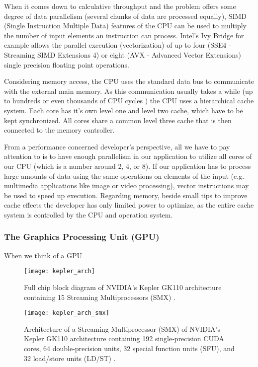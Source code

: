 When it comes down to calculative throughput and the problem offers some degree of data parallelism (several chunks of data are processed equally), SIMD (Single Instruction Multiple Data) features of the CPU can be used to multiply the number of input elements an instruction can process. Intel's Ivy Bridge for example allows the parallel execution (vectorization) of up to four (SSE4 - Streaming SIMD Extensions 4) or eight (AVX - Advanced Vector Extensions) single precision floating point operations.

Considering memory access, the CPU uses the standard data bus to communicate with the external main memory. As this communication usually takes a while (up to hundreds or even thousands of CPU cycles  \cite[p. 54]{opencl_book}) the CPU uses a hierarchical cache system. Each core has it's own level one and level two cache, which have to be kept synchronized. All cores share a common level three cache that is then connected to the memory controller.

From a performance concerned developer's perspective, all we have to pay attention to is to have enough parallelism in our application to utilize all cores of our CPU (which is a number around 2, 4, or 8). If our application has to process large amounts of data using the same operations on elements of the input (e.g. multimedia applications like image or video processing), vector instructions may be used to speed up execution. Regarding memory, beside small tips to improve cache effects the developer has only limited power to optimize, as the entire cache system is controlled by the CPU and operation system. 


\subsubsection{The Graphics Processing Unit (GPU)}

When we think of a GPU 

\begin{figure}[h]
\centering
\texttt{[image: kepler\_arch]}
\caption{Full chip block diagram of NVIDIA's Kepler GK110 architecture containing 15 Streaming Multiprocessors (SMX) \cite{kepler_arch}.}
\label{fig:kepler_arch}
\end{figure}

\begin{figure}[h]
\centering
\texttt{[image: kepler\_arch\_smx]}
\caption{Architecture of a Streaming Multiprocessor (SMX) of NVIDIA's Kepler GK110 architecture containing 192 single‐precision CUDA cores, 64 double‐precision units, 32 special function units (SFU), and 32 load/store units (LD/ST) \cite{kepler_arch}.}
\label{fig:kepler_arch_smx}
\end{figure}


